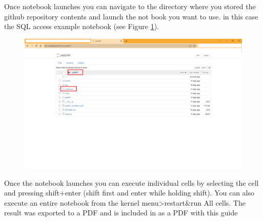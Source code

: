 \documentclass{article}
\begin{document}
Once notebook launches you can navigate to the directory where you stored the github repository contents and launch the not book you want to use. in this case the SQL access example notebook (see Figure \ref{fig:notbookslocation}).

\begin{figure}[H]
\centering
\includegraphics[scale=0.4]{notbookslocation.png}
\label{fig:notbookslocation}
\end{figure}

Once the notebook launches you can execute individual cells by selecting the cell and pressing shift+enter (shift first and enter while holding shift). You can also execute an entire notebook from the kernel menu>restart$\&$run All cells. 
The result was exported to a PDF and is included in as a PDF with this guide
\end{document}
